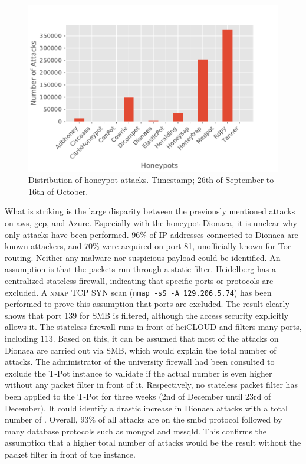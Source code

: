 \begin{figure}
    \centering
    \includegraphics[width=\textwidth]{figures/tpot-overview-attacks.pdf}
    \caption[Distribution of honeypot attacks]{
        Distribution of honeypot attacks.
        Timestamp; 26th of September to 16th of October.
    }
    \label{fig:overview-attacks}
\end{figure}

What is striking is the large disparity between the previously mentioned attacks on \ac{aws}, \ac{gcp}, and Azure.
Especially with the honeypot Dionaea, it is unclear why only  attacks have been performed.
$96\%$ of IP addresses connected to Dionaea are known attackers, and $70\%$ were acquired on port 81, unofficially known for Tor routing.
Neither any malware nor suspicious payload could be identified.
An assumption is that the packets run through a static filter.
Heidelberg has a centralized stateless firewall, indicating that specific ports or protocols are excluded.
A \textsc{nmap} TCP SYN scan (\verb|nmap -sS -A 129.206.5.74|) has been performed to prove this assumption that ports are excluded.
The result clearly shows that port 139 for SMB is filtered, although the access security explicitly allows it.
The stateless firewall runs in front of heiCLOUD and filters many ports, including $113$.
Based on this, it can be assumed that most of the attacks on Dionaea are carried out via SMB, which would explain the total number of attacks.
The administrator of the university firewall had been consulted to exclude the T-Pot instance to validate if the actual number is even higher without any packet filter in front of it.
Respectively, no stateless packet filter has been applied to the T-Pot for three weeks (2nd of December until 23rd of December).
It could identify a drastic increase in Dionaea attacks with a total number of .
Overall, $93\%$ of all attacks are on the smbd protocol followed by many database protocols such as mongod and mssqld.
This confirms the assumption that a higher total number of attacks would be the result without the packet filter in front of the instance.

